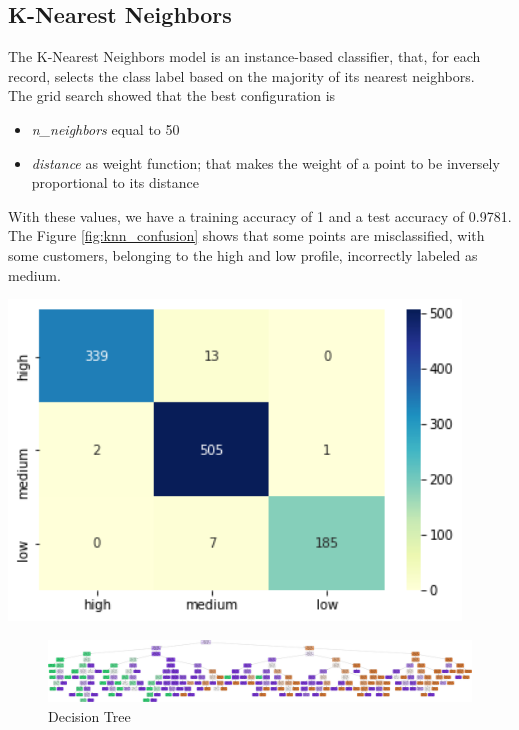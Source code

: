 \subsection{K-Nearest Neighbors}
\begin{minipage}{0.59\textwidth}
The K-Nearest Neighbors model is an instance-based classifier, that, for each record, selects the class label based on the majority of its nearest neighbors.\\
The grid search showed that the best configuration is
\begin{itemize}
\item \emph{n\_neighbors} equal to 50
\item \emph{distance} as weight function; that makes the weight of a point to be inversely proportional to its distance
\end{itemize}

With these values, we have a training accuracy of 1 and a test accuracy of 0.9781.
The Figure \ref{fig:knn_confusion} shows that some points are misclassified, with some customers, belonging to the high and low profile, incorrectly labeled as medium.
\end{minipage}
\begin{minipage}{0.4\textwidth}
\centering
\includegraphics[width=0.90\textwidth]{img/classification/knn_confusion.png}
\captionsetup{justification=centering}
\label{fig:knn_confusion}
\end{minipage}

\begin{figure}
\centering
\includegraphics[width=\linewidth]{img/classification/decision_tree.png}
\caption{Decision Tree}
\label{fig:decision_tree}
\end{figure}


